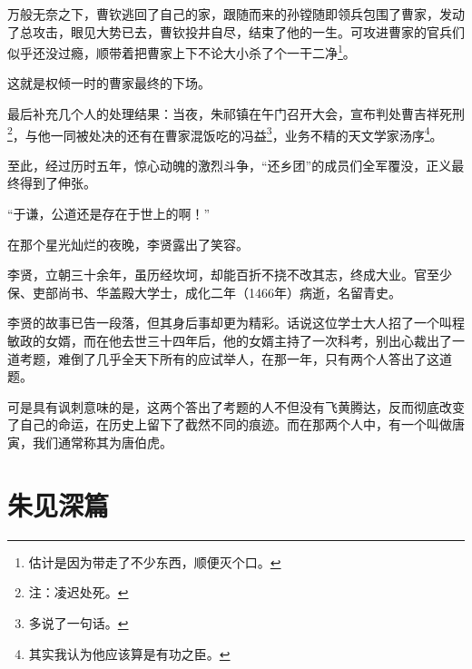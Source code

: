 \begin{multicols}{\theparacolNo}
万般无奈之下，曹钦逃回了自己的家，跟随而来的孙镗随即领兵包围了曹家，发动了总攻击，眼见大势已去，曹钦投井自尽，结束了他的一生。可攻进曹家的官兵们似乎还没过瘾，顺带着把曹家上下不论大小杀了个一干二净\footnote{估计是因为带走了不少东西，顺便灭个口。}。

这就是权倾一时的曹家最终的下场。

最后补充几个人的处理结果：当夜，朱祁镇在午门召开大会，宣布判处曹吉祥死刑\footnote{注：凌迟处死。}，与他一同被处决的还有在曹家混饭吃的冯益\footnote{多说了一句话。}，业务不精的天文学家汤序\footnote{其实我认为他应该算是有功之臣。}。

至此，经过历时五年，惊心动魄的激烈斗争，“还乡团”的成员们全军覆没，正义最终得到了伸张。

“于谦，公道还是存在于世上的啊！”

在那个星光灿烂的夜晚，李贤露出了笑容。

李贤，立朝三十余年，虽历经坎坷，却能百折不挠不改其志，终成大业。官至少保、吏部尚书、华盖殿大学士，成化二年（1466年）病逝，名留青史。
\begin{quote}
	\begin{spacing}{0.5}  %
		\textit{{\footnotesize
				\begin{description}
					\item[\textcolor{Gray}{\faQuoteRight}] 史赞：伟哉！宰相才也！
				\end{description}
		}}
	\end{spacing}
\end{quote}

李贤的故事已告一段落，但其身后事却更为精彩。话说这位学士大人招了一个叫程敏政的女婿，而在他去世三十四年后，他的女婿主持了一次科考，别出心裁出了一道考题，难倒了几乎全天下所有的应试举人，在那一年，只有两个人答出了这道题。

可是具有讽刺意味的是，这两个答出了考题的人不但没有飞黄腾达，反而彻底改变了自己的命运，在历史上留下了截然不同的痕迹。而在那两个人中，有一个叫做唐寅，我们通常称其为唐伯虎。
\ifnum{}
	\end{multicols}
\fi
\newpage
\chapter*{朱见深篇}
